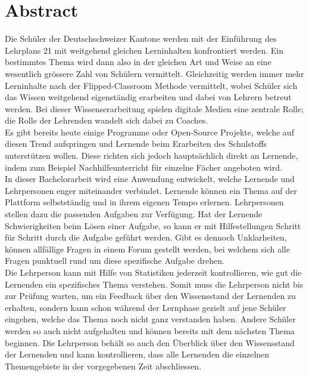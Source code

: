 \afterpage{\blankpage}
\section*{Abstract}

Die Schüler der Deutschschweizer Kantone werden mit der Einführung des Lehrplans 21 mit weitgehend gleichen Lerninhalten konfrontiert werden. Ein bestimmtes Thema wird dann also in der gleichen Art und Weise an eine wesentlich grössere Zahl von Schülern vermittelt. Gleichzeitig werden immer mehr Lerninhalte nach der Flipped-Classroom Methode vermittelt, wobei Schüler sich das Wissen weitgehend eigenständig erarbeiten und dabei von Lehrern betreut werden. Bei dieser Wissenserarbeitung spielen digitale Medien eine zentrale Rolle; die Rolle der Lehrenden wandelt sich dabei zu Coaches. \\

Es gibt bereits heute einige Programme oder Open-Source Projekte, welche auf diesen Trend aufspringen und Lernende beim Erarbeiten des Schulstoffs unterstützen wollen. Diese richten sich jedoch hauptsächlich direkt an Lernende, indem zum Beispiel Nachhilfeunterricht für einzelne Fächer angeboten wird. \\

In dieser Bachelorarbeit wird eine Anwendung entwickelt, welche Lernende und Lehrpersonen enger miteinander verbindet. Lernende können ein Thema auf der Plattform selbstständig und in ihrem eigenen Tempo erlernen. Lehrpersonen stellen dazu die passenden Aufgaben zur Verfügung. Hat der Lernende Schwierigkeiten beim Lösen einer Aufgabe, so kann er mit Hilfestellungen Schritt für Schritt durch die Aufgabe geführt werden. Gibt es dennoch Unklarheiten, können allfällige Fragen in einem Forum gestellt werden, bei welchem sich alle Fragen punktuell rund um diese spezifische Aufgabe drehen. \\

Die Lehrperson kann mit Hilfe von Statistiken jederzeit kontrollieren, wie gut die Lernenden ein spezifisches Thema verstehen. Somit muss die Lehrperson nicht bis zur Prüfung warten, um ein Feedback über den Wissensstand der Lernenden zu erhalten, sondern kann schon während der Lernphase gezielt auf jene Schüler eingehen, welche das Thema noch nicht ganz verstanden haben. Andere Schüler werden so auch nicht aufgehalten und können bereits mit dem nächsten Thema beginnen. Die Lehrperson behält so auch den Überblick über den Wissensstand der Lernenden und kann kontrollieren, dass alle Lernenden die einzelnen Themengebiete in der vorgegebenen Zeit abschliessen.


\newpage